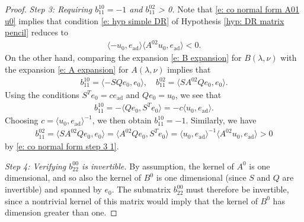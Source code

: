 \documentclass[11pt]{article}
\numberwithin{equation}{section}
\numberwithin{prop}{section}
\begin{document}
\begin{proof}
	\emph{Step 3: Requiring $b_{11}^{10} = -1$ and $b_{11}^{02}$ > 0.} Note that \eqref{e: co normal form A01 u0} implies that condition \eqref{e: hyp simple DR} of Hypothesis \ref{hyp: DR matrix pencil} reduces to 
	\begin{align}
	\langle -u_0, e_\mathrm{ad}\rangle \langle A^{02} u_0, e_\mathrm{ad}\rangle < 0. \label{e: co normal form step 3 1}
	\end{align}
	On the other hand, comparing the expansion \eqref{e: B expansion} for $B(\lambda, \nu)$ with the expansion \eqref{e: A expansion} for $A(\lambda, \nu)$ implies that 
	\begin{align}
	b_{11}^{10} = \langle - SQ e_0, e_0 \rangle, \quad b_{11}^{02} = \langle S A^{02} Q e_0, e_0 \rangle.
	\end{align}
	Using the conditions $S^T e_0 = c e_\mathrm{ad}$ and $Q e_0 = u_0$, we see that 
	\begin{align*}
	b_{11}^{10} = - \langle Q e_0, S^T e_0 \rangle = - c \langle u_0, e_\mathrm{ad} \rangle.
	\end{align*}
	Choosing $c = \langle u_0, e_\mathrm{ad} \rangle^{-1}$, we then obtain $b_{11}^{10} = -1$. Similarly, we have 
	\begin{align}
	b_{11}^{02} = \langle S A^{02} Q e_0, e_0 \rangle = \langle A^{02} Q e_0, S^T e_0 \rangle =  \langle u_0, e_\mathrm{ad} \rangle^{-1} \langle A^{02} u_0, e_\mathrm{ad} \rangle > 0
	\end{align}
	by \eqref{e: co normal form step 3 1}. 
	
	\emph{Step 4: Verifying $b_{22}^{00}$ is invertible.} By assumption, the kernel of $A^0$ is one dimensional, and so also the kernel of $B^0$ is one dimensional (since $S$ and $Q$ are invertible) and spanned by $e_0$. The submatrix $b_{22}^{00}$ must therefore be invertible, since a nontrivial kernel of this matrix would imply that the kernel of $B^0$ has dimension greater than one. 
\end{proof}
\end{document}

